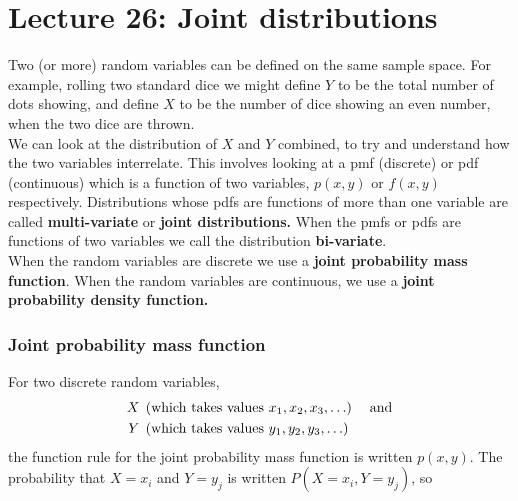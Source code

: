 \chapter{Lecture 26: Joint distributions} \label{multi-variate distribution} \label{joint distribution} \label{bi-variate}
Two (or more) random variables can be defined on the same sample space. For example, rolling two standard dice we might define $Y$ to be the total number of dots showing, and define $X$ to be the number of dice showing an even number, when the two dice are thrown. \\

\noindent We can look at the distribution of $X$ and $Y$ combined, to try and understand how the two variables interrelate. This involves looking at a pmf (discrete) or pdf (continuous) which is a function of two variables, $p(x,y)$ or $f(x,y)$ respectively. Distributions whose pdfs are functions of more than one variable are called \textbf{multi-variate} or \textbf{joint distributions.} When the pmfs or pdfs are functions of two variables we call the distribution \textbf{bi-variate}. \\

\noindent When the random variables are discrete we use a \textbf{joint probability mass function}. When the random variables are continuous, we use a \textbf{joint probability density function.}

\subsection{Joint probability mass function} \label{p(x_i,y_j)=P(X=x_i,Y=y_j)} \label{joint pmf}
For two discrete random variables,
\begin{align*}
X & \; \left(\text{which takes values $x_1,x_2,x_3,\ldots$}\right) \;\;\;\; \text{and} \\
Y & \; \left(\text{which takes values $y_1,y_2,y_3,\ldots$}\right)
\end{align*}
the function rule for the joint probability mass function is written $p(x,y)$.  The probability that $X = x_i$ and $Y = y_j$ is written $P(X=x_i,Y=y_j)$, so

  	\bigskip
	
	\hfil{}
	\bigskip
	\bigskip

